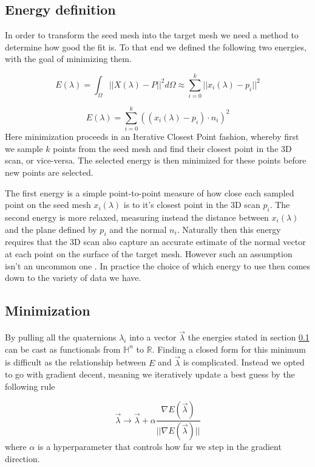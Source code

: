 \documentclass[sigconf]{acmart}
\begin{document}
\subsection{Energy definition} \label{energy_definition}
In order to transform the seed mesh into the target mesh we need a method to determine how good the fit is. To that end we defined the following two energies, with the goal of minimizing them. 

\begin{equation}
\label{eqn:03}
E(\lambda) = \int_{\Omega}||X(\lambda) - P||^{2}d\Omega \approx \sum_{i=0}^{k}||x_{i}(\lambda) - p_{i}||^{2}
\end{equation}

\begin{equation}
\label{eqn:04}
E(\lambda) = \sum_{i=0}^{k}((x_{i}(\lambda) - p_{i}) \cdot n_{i})^{2}
\end{equation}
Here minimization proceeds in an Iterative Closest Point \cite{Bouaziz:2015} fashion, whereby first we sample $k$ points from the seed mesh and find their closest point in the 3D scan, or vice-versa. The selected energy is then minimized for these points before new points are selected.

The first energy is a simple point-to-point measure of how close each sampled point on the seed mesh $x_{i}(\lambda)$ is to it's closest point in the 3D scan $p_{i}$. The second energy is more relaxed, measuring instead the distance between $x_{i}(\lambda)$ and the plane defined by $p_{i}$ and the normal $n_{i}$. Naturally then this energy requires that the 3D scan also capture an accurate estimate of the normal vector at each point on the surface of the target mesh. However such an assumption isn't an uncommon one \cite{Hoppe:2006}. In practice the choice of which energy to use then comes down to the variety of data we have.

\subsection{Minimization}
By pulling all the quaternions $\lambda_{i}$ into a vector $\vec{\lambda}$ the energies stated in section \ref{energy_definition} can be cast as functionals from $\mathbb{H}^{n}$ to $\mathbb{R}$. Finding a closed form for this minimum is difficult as the relationship between $E$ and $\vec{\lambda}$ is complicated. Instead we opted to go with gradient decent, meaning we iteratively update a best guess by the following rule

\begin{equation}
\label{eqn:05}
\vec{\lambda} \rightarrow \vec{\lambda} + \alpha\frac{\nabla E(\vec{\lambda})}{||\nabla E(\vec{\lambda})||}
\end{equation}
where $\alpha$ is a hyperparameter that controls how far we step in the gradient direction.
\end{document}
